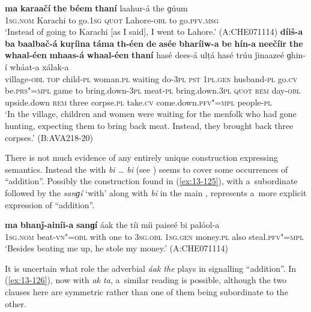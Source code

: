 \ea
\label{ex:13-123}
\gll \textbf{ma} \textbf{karaačí} \textbf{the} \textbf{béem} \textbf{thaní} laahur-á the  ɡúum \\
\textsc{1sg.nom} Karachi to go.\textsc{1sg} \textsc{quot} Lahore-\textsc{obl} to go.\textsc{pfv.msg} \\
\glt `Instead of going to Karachi [as I said], I went to Lahore.' (A:CHE071114)
\ex
\label{ex:13-124}
\gll \textbf{díiš-a} \textbf{ba} \textbf{baalbač-á} \textbf{kuṛíina} \textbf{táma} \textbf{th-éen} \textbf{de} \textbf{asée} \textbf{bharíiw-a} \textbf{be} \textbf{hín-a} \textbf{neečíir} \textbf{the} \textbf{whaal-éen} \textbf{mhaas-á} \textbf{whaal-éen} \textbf{thaní} hasé dees-á ulṭá hasé trúu ǰinaazeé ɡhin-í wháat-a xálak-a\\
village-\textsc{obl} \textsc{top} child-\textsc{pl} woman.\textsc{pl} waiting do-\textsc{3pl}
\textsc{pst} \textsc{1pl.gen} husband-\textsc{pl} go.\textsc{cv} be.\textsc{prs"=mpl} game to
bring.down-\textsc{3pl} meat-\textsc{pl} bring.down.\textsc{3pl} \textsc{quot} \textsc{rem} day-\textsc{obl} upside.down \textsc{rem} three corpse.\textsc{pl} take.\textsc{cv} come.down.\textsc{pfv"=mpl} people-\textsc{pl}\\
\glt `In the village, children and women were waiting for the menfolk who had gone hunting, expecting them to bring back meat. Instead, they brought back three corpses.' (B:AVA218-20) 
\z

 There is not much evidence of any entirely unique construction expressing  semantics. Instead the  with \textit{bi {\ldots} bi} (see ) seems to cover some occurrences of ``addition''. Possibly the construction found in (\ref{ex:13-125}), with a~subordinate  followed by the  \textit{sanɡí} `with' along with \textit{bi} in the main , represents a~more explicit expression of ``addition''. 

\begin{exe}
\ex
\label{ex:13-125}
\gll \textbf{ma} \textbf{bhanǰ-ainíi-a} \textbf{sanɡí} áak the tíi míi  paiseé bi palóol-a \\
\textsc{1sg.nom} beat-\textsc{vn"=obl} with one to \textsc{3sg.obl} \textsc{1sg.gen} money.\textsc{pl}  also steal.\textsc{pfv"=mpl} \\
\glt `Besides beating me up, he stole my money.' (A:CHE071114) 
\end{exe}

It is uncertain what role the adverbial  \textit{áak the} plays in signalling ``addition''. In (\ref{ex:13-126}), now with \textit{ak ta}, a~similar reading is possible, although the two clauses here are symmetric rather than one of them being subordinate to the other.

